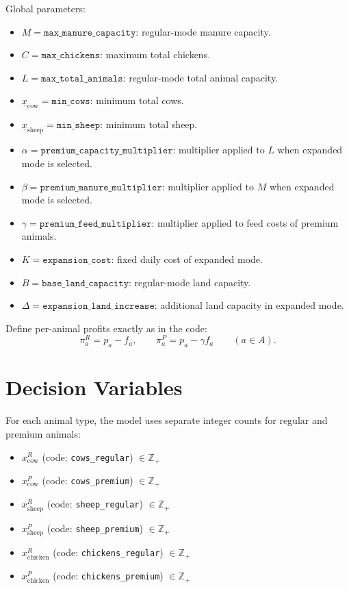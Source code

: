 Global parameters:
\begin{itemize}
    \item \(M=\texttt{max\_manure\_capacity}\): regular-mode manure capacity.
    \item \(C=\texttt{max\_chickens}\): maximum total chickens.
    \item \(L=\texttt{max\_total\_animals}\): regular-mode total animal capacity.
    \item \(\underline{x}_{\mathrm{cow}}=\texttt{min\_cows}\): minimum total cows.
    \item \(\underline{x}_{\mathrm{sheep}}=\texttt{min\_sheep}\): minimum total sheep.
    \item \(\alpha=\texttt{premium\_capacity\_multiplier}\): multiplier applied to \(L\) when expanded mode is selected.
    \item \(\beta=\texttt{premium\_manure\_multiplier}\): multiplier applied to \(M\) when expanded mode is selected.
    \item \(\gamma=\texttt{premium\_feed\_multiplier}\): multiplier applied to feed costs of premium animals.
    \item \(K=\texttt{expansion\_cost}\): fixed daily cost of expanded mode.
    \item \(B=\texttt{base\_land\_capacity}\): regular-mode land capacity.
    \item \(\Delta=\texttt{expansion\_land\_increase}\): additional land capacity in expanded mode.
\end{itemize}

Define per-animal profits exactly as in the code:
\[
\pi_a^{R}=p_a-f_a,\qquad \pi_a^{P}=p_a-\gamma f_a \qquad (a\in A).
\]

\section*{Decision Variables}

For each animal type, the model uses separate integer counts for regular and premium animals:
\begin{itemize}
    \item \(x_{\mathrm{cow}}^{R}\) (code: \texttt{cows\_regular}) \(\in \mathbb{Z}_{+}\)
    \item \(x_{\mathrm{cow}}^{P}\) (code: \texttt{cows\_premium}) \(\in \mathbb{Z}_{+}\)
    \item \(x_{\mathrm{sheep}}^{R}\) (code: \texttt{sheep\_regular}) \(\in \mathbb{Z}_{+}\)
    \item \(x_{\mathrm{sheep}}^{P}\) (code: \texttt{sheep\_premium}) \(\in \mathbb{Z}_{+}\)
    \item \(x_{\mathrm{chicken}}^{R}\) (code: \texttt{chickens\_regular}) \(\in \mathbb{Z}_{+}\)
    \item \(x_{\mathrm{chicken}}^{P}\) (code: \texttt{chickens\_premium}) \(\in \mathbb{Z}_{+}\)
\end{itemize}

